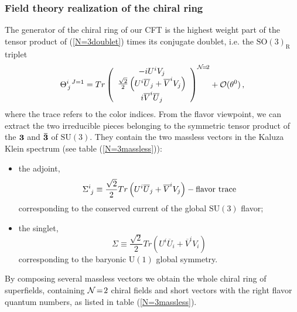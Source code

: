 \documentclass[a4paper,12pt]{article}
\newcommand{\eqn}[1]{(\ref{#1})}
\begin{document}
\subsubsection{Field theory realization of the chiral ring}
The generator of the chiral ring of our CFT is the highest
weight part of the tensor product of \eqn{N=3doublet}
times its conjugate doublet, i.e. the $\mathrm{SO(3)_R}$ triplet
\begin{equation}\label{N=3triplet}
\Theta^{i\ J=1}_{\,j}=Tr\left(\begin{array}{c}
-iU^iV_j\\
\frac{\sqrt{2}}{2}\left(U^i\overline U_j+\overline V^iV_j\right)\\
i\overline V^i\overline U_j
\end{array}\right)^{{\cal N}\!=\!2}+{\cal O}(\theta^0)\,,
\end{equation}
where the trace refers to the color indices.
From the flavor viewpoint, we can extract the two irreducible pieces
belonging to the symmetric tensor product of the $\bf 3$ and
$\bf \bar 3$ of $\mathrm{SU(3)}$.
They contain the two massless vectors in the Kaluza Klein spectrum
(see table \eqn{N=3massless}):
\begin{itemize}
\item the adjoint,
\begin{equation}
\Sigma^i_{\,\,j}\equiv\frac{\sqrt{2}}{2}
Tr\left(U^i\overline U_j+\overline V^iV_j\right)-{\rm flavor\ trace}
\end{equation}
corresponding to the conserved current of the global $\mathrm{SU(3)}$ flavor;
\item the singlet,
\begin{equation}
\Sigma\equiv\frac{\sqrt{2}}{2}
Tr\left(U^i\overline U_i+\overline V^iV_i\right)
\end{equation}
corresponding to the baryonic $\mathrm{U(1)}$ global symmetry.
\end{itemize}
\par
By composing several massless vectors we obtain the whole
chiral ring of superfields, containing ${\cal N}\!=\!2$
chiral fields and short vectors with the right flavor quantum
numbers, as listed in table \eqn{N=3massless}.
\end{document}
